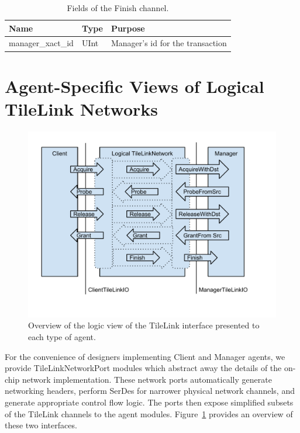 \begin{table}[ht]
\begin{center}
\begin{tabular}{|l|l|l|}
    \hline
    Name & Type & Purpose \\ \hline \hline
manager\_xact\_id & UInt & Manager's id for the transaction \\ \hline
\end{tabular}
\end{center}
\caption{Fields of the Finish channel.}
\label{tab:finish}
\end{table}

\section{Agent-Specific Views of Logical TileLink Networks}

\begin{figure}[p]
\centering
\includegraphics[width=1\columnwidth]{tilelink/figures/agent-specific.pdf}
\caption{Overview of the logic view of the TileLink interface presented to each type of agent.}
\label{fig:agent}
\end{figure}

For the convenience of designers implementing Client and Manager agents, we provide TileLinkNetworkPort modules which abstract away the details of the on-chip network implementation.
These network ports automatically generate networking headers, perform SerDes for narrower physical network channels, and generate appropriate control flow logic.
The ports then expose simplified subsets of the TileLink channels to the agent modules.
Figure~\ref{fig:agent} provides an overview of these two interfaces.

